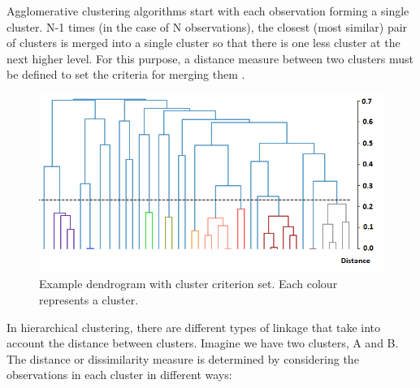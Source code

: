 Agglomerative clustering algorithms start with each observation forming a single cluster. N-1  times (in the case of N observations), the closest (most similar) pair of clusters is merged into a single cluster so that there is one less cluster at the next higher level. For this purpose, a distance measure between two clusters must be defined to set the criteria for merging them \cite{hastie01statisticallearning}. 

\begin{figure}[h]
    \centering
    \includegraphics[scale=0.8]{Images/Methods/Hierarchical/Hierarchical dendogram.png}
    \caption{Example dendrogram with cluster criterion set. Each colour represents a cluster.}
\end{figure}


In hierarchical clustering, there are different types of linkage that take into account the distance between clusters. Imagine we have two clusters, A and B. The distance or dissimilarity measure is determined by considering the observations in each cluster in different ways:

